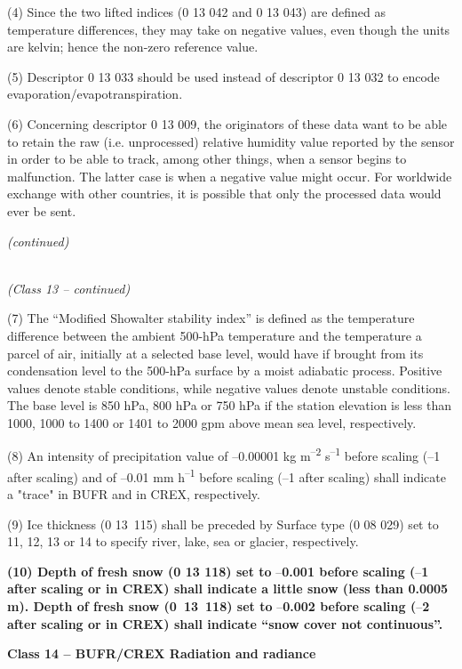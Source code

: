 (4) Since the two lifted indices (0 13 042 and 0 13 043) are defined as temperature differences, they may take on negative values, even though the units are kelvin; hence the non-zero reference value.

(5) Descriptor 0 13 033 should be used instead of descriptor 0 13 032 to encode evaporation/evapotranspiration.

(6) Concerning descriptor 0 13 009, the originators of these data want to be able to retain the raw (i.e. unprocessed) relative humidity value reported by the sensor in order to be able to track, among other things, when a sensor begins to malfunction. The latter case is when a negative value might occur. For worldwide exchange with other countries, it is possible that only the processed data would ever be sent.

\emph{(continued)}

\emph{\\
(Class 13 -- continued)}

(7) The ``Modified Showalter stability index'' is defined as the temperature difference between the ambient 500-hPa temperature and the temperature a parcel of air, initially at a selected base level, would have if brought from its condensation level to the 500-hPa surface by a moist adiabatic process. Positive values denote stable conditions, while negative values denote unstable conditions. The base level is 850 hPa, 800 hPa or 750 hPa if the station elevation is less than 1000, 1000 to 1400 or 1401 to 2000 gpm above mean sea level, respectively.

(8) An intensity of precipitation value of --0.00001 kg m\textsuperscript{--2} s\textsuperscript{--1} before scaling (--1 after scaling) and of --0.01 mm h\textsuperscript{--1} before scaling (--1 after scaling) shall indicate a "trace" in BUFR and in CREX, respectively.

(9) Ice thickness (0 13~115) shall be preceded by Surface type (0 08 029) set to 11, 12, 13 or 14 to specify river, lake, sea or glacier, respectively.

\textbf{(10) Depth of fresh snow (0 13 118) set to} --\textbf{0.001 before scaling (}--\textbf{1 after scaling or in CREX) shall indicate a little snow (less than 0.0005 m). Depth of fresh snow (0~13~118) set to} --\textbf{0.002 before scaling (}--\textbf{2 after scaling or in CREX) shall indicate ``snow cover not continuous''.}

\textbf{Class 14 -- BUFR/CREX Radiation and radiance}

